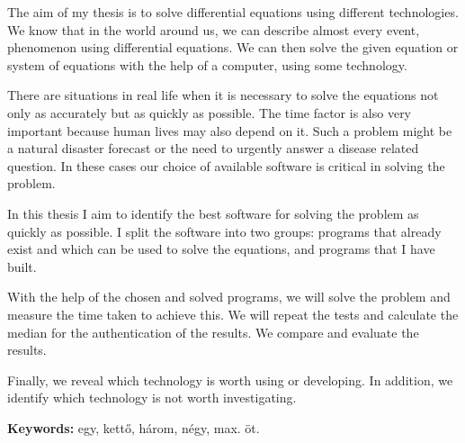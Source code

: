 The aim of my thesis is to solve differential equations using different technologies. We know that in the world around us, we can describe almost every
event, phenomenon using differential equations. We can then solve the given equation or system of equations with the help of a computer, using some technology.

There are situations in real life when it is necessary to solve the equations not only as  accurately but as quickly as possible. The time factor is also very important because human lives may also depend on it. Such a problem might be a natural disaster forecast or the need to urgently answer a disease related question. In these cases our choice of available software is critical in solving the problem.

In this thesis I aim to identify the best software for solving the problem as quickly as possible. I split the software into two groups: programs that already exist and which can be used to solve the equations, and programs that I have built.

With the help of the chosen and solved programs, we will solve the problem and measure the time taken to achieve this. We will repeat the tests and calculate the median for the authentication of the results. We compare and evaluate the results.

Finally, we reveal which technology is worth using or developing. In addition, we identify which technology is not worth investigating.

\vspace*{2cm}

\noindent \textbf{Keywords:} egy, kett\H o, h\'arom, n\'egy, max. \"ot.

\vfill
\dolgozatnyelve
{}
